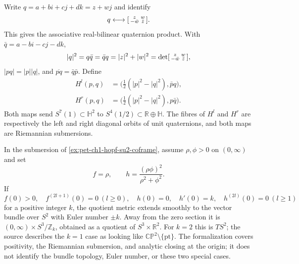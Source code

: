 \begin{remark}
  \label{rem:pet-ch1-ex-22}
  \leanok
  Write $q=a+bi+cj+dk=z+wj$ and identify
  \[
    q\longleftrightarrow
      \begin{bsmallmatrix}z&w\\-\bar w&\bar z\end{bsmallmatrix}.
  \]
  This gives the associative real-bilinear quaternion product. With
  $\bar q=a-bi-cj-dk$,
  \[
    |q|^2=q\bar q=\bar qq=|z|^2+|w|^2
      =\det\begin{bsmallmatrix}z&w\\-\bar w&\bar z\end{bsmallmatrix},
  \]
  $|pq|=|p||q|$, and $\overline{pq}=\bar q\bar p$. Define
  \[
  \begin{aligned}
    H^l(p,q)&=\big(\tfrac12(|p|^2-|q|^2),\bar p q\big),\\
    H^r(p,q)&=\big(\tfrac12(|p|^2-|q|^2),p\bar q\big).
  \end{aligned}
  \]
  Both maps send $S^7(1)\subset\mathbb{H}^2$ to
  $S^4(1/2)\subset\mathbb{R}\oplus\mathbb{H}$. The fibres of $H^l$ and
  $H^r$ are respectively the left and right diagonal orbits of unit
  quaternions, and both maps are Riemannian submersions.
\end{remark}

\begin{remark}
  \label{rem:pet-ch1-ex-23}
  \leanok
  In the submersion of \cref{ex:pet-ch1-hopf-su2-coframe}, assume
  $\rho,\phi>0$ on $(0,\infty)$ and set
  \[
    f=\rho,
    \qquad
    h=\frac{(\rho\phi)^2}{\rho^2+\phi^2}.
  \]
  If
  \[
    f(0)>0,
    \quad f^{(2l+1)}(0)=0\ (l\ge0),
    \quad h(0)=0,
    \quad h'(0)=k,
    \quad h^{(2l)}(0)=0\ (l\ge1)
  \]
  for a positive integer $k$, the quotient metric extends smoothly to the
  vector bundle over $S^2$ with Euler number $\pm k$. Away from the zero
  section it is $(0,\infty)\times S^3/\mathbb{Z}_k$, obtained as a quotient of
  $S^3\times\mathbb{R}^2$. For $k=2$ this is $TS^2$; the source describes the
  $k=1$ case as looking like $\mathbb{CP}^2\setminus\{\mathrm{pt}\}$.
  The formalization covers positivity,
  the Riemannian submersion, and analytic closing at the origin; it does not
  identify the bundle topology, Euler number, or these two special cases.
\end{remark}

